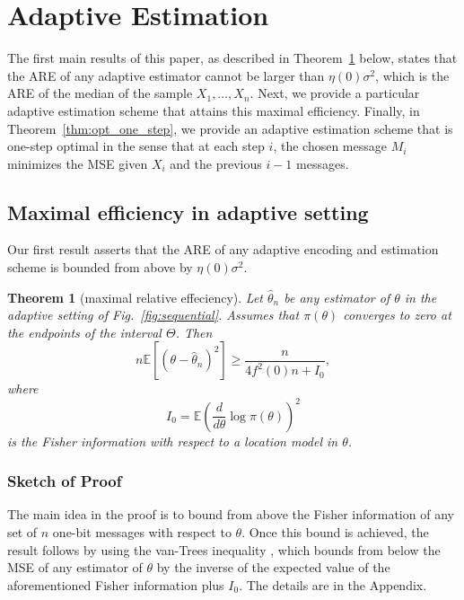 \documentclass[letterpaper, 11pt]{IEEEtran}      %
\newtheorem{thm}{\bf{Theorem}}
\begin{document}
\section{Adaptive Estimation \label{sec:sequential}}
The first main results of this paper, as described in Theorem~\ref{thm:adpative_lower_bound} below, states that the ARE of any adaptive estimator cannot be larger than $\eta(0)\sigma^2$, which is the ARE of the median of the sample $X_1,\ldots,X_n$. Next, we provide a particular adaptive estimation scheme that attains this maximal efficiency. Finally, in Theorem~\ref{thm:opt_one_step}, we provide an adaptive estimation scheme that is one-step optimal in the sense that at each step $i$, the chosen message $M_i$  minimizes the MSE given $X_i$ and the previous $i-1$ messages. %

\subsection{Maximal efficiency in adaptive setting}
Our first result asserts that the ARE of any adaptive encoding and estimation scheme is bounded from above by $\eta(0)\sigma^2$. %
\begin{thm}[maximal relative effeciency] \label{thm:adpative_lower_bound}
Let $\hat{\theta}_n$ be any estimator of $\theta$ in the adaptive setting of Fig.~\ref{fig:sequential}. Assumes that $\pi(\theta)$ converges to zero at the endpoints of the interval $\Theta$. Then
\[
n\mathbb E\left[ (\theta-\hat{\theta}_n)^2 \right] \geq   \frac{n}{ 4f^2(0) n + I_0},
\]
where 
\[
I_0 = \mathbb E \left( \frac{d}{d\theta} \log \pi (\theta) \right)^2
\]
is the Fisher information with respect to a location model in $\theta$. 
\end{thm}

\subsubsection*{Sketch of Proof}
The main idea in the proof is to bound from above the Fisher information of any set of $n$ one-bit messages with respect to $\theta$. Once this bound is achieved, the result follows by using the van-Trees inequality \cite[Thm. 2.13]{tsybakov2008introduction},\cite{gill1995applications} which bounds from below the MSE of any estimator of $\theta$ by the inverse of the expected value of the aforementioned Fisher information plus $I_0$. The details are in the Appendix.\\
\end{document}
